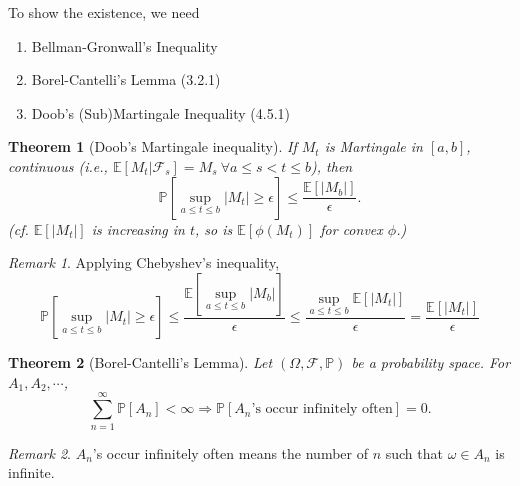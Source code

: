 \documentclass[12pt]{report}
\renewcommand{\P}{\mathbb{P}}
\newcommand{\F}{\mathcal{F}}
\newcommand{\E}{\mathbb{E}}
\renewcommand{\1}{\mathbb{1}}
\renewcommand{\O}{\Omega}
\theoremstyle{break}
\newtheorem{thm}{Theorem}[section] %
\theoremstyle{newdef}
\theoremstyle{remark}
\newtheorem*{rem}{Remark} %
\begin{document}





To show the existence, we need
\begin{enumerate}
\item Bellman-Gronwall's Inequality
\item Borel-Cantelli's Lemma (3.2.1)
\item Doob's (Sub)Martingale Inequality (4.5.1)
\end{enumerate}




\begin{thm}[Doob's Martingale inequality]
If $M_t$ is Martingale in $[a,b]$, continuous (i.e., $\E[M_t | \F_s] = M_s \ \forall a \leq s < t \leq b$), then
$$
\P\left[\sup_{a\leq t \leq b}\left|M_t\right| \geq \epsilon \right] \leq \frac{\E[|M_b|]}{\epsilon}.
$$
(\textit{cf.} $\E[|M_t|]$ is increasing in $t$, so is $\E[\phi(M_t)]$ for convex $\phi$.)
\end{thm}

\begin{rem}
Applying Chebyshev's inequality,
$$
\P\left[\sup_{a\leq t \leq b}\left|M_t\right| \geq \epsilon \right]
\leq \frac{\E[\sup_{a\leq t \leq b}|M_b|]}{\epsilon}
\leq \frac{\sup_{a\leq t\leq b}\E[|M_t|]}{\epsilon}
= \frac{\E[|M_t|]}{\epsilon}
$$
\end{rem}




\begin{thm}[Borel-Cantelli's Lemma]
Let $(\O,\F,\P)$ be a probability space.
For $A_1, A_2, \cdots$,
$$
\sum_{n=1}^\infty \P[A_n] < \infty \Rightarrow \P[A_n\text{'s occur infinitely often}] = 0.
$$
\end{thm}

\begin{rem}
$A_n$'s occur infinitely often means the number of $n$ such that $\omega \in A_n$ is infinite.
\end{rem}
\end{document}
